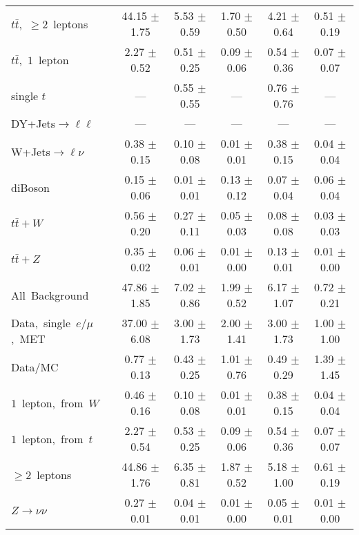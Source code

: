 \documentclass{article}
\begin{document}
\begin{longtable}{|l|c|c|c|c|c|}
$t\bar{t}$,~$\ge2$~leptons & 44.15 $\pm$ 1.75  & 5.53 $\pm$ 0.59  & 1.70 $\pm$ 0.50  & 4.21 $\pm$ 0.64  & 0.51 $\pm$ 0.19 \\* 
$t\bar{t}$,~$1$~lepton & 2.27 $\pm$ 0.52  & 0.51 $\pm$ 0.25  & 0.09 $\pm$ 0.06  & 0.54 $\pm$ 0.36  & 0.07 $\pm$ 0.07 \\* 
single $t$  & ---  & 0.55 $\pm$ 0.55  & ---  & 0.76 $\pm$ 0.76  & --- \\* 
DY+Jets$\rightarrow\ell\ell$  & ---  & ---  & ---  & ---  & --- \\* 
W+Jets$\rightarrow\ell\nu$  & 0.38 $\pm$ 0.15  & 0.10 $\pm$ 0.08  & 0.01 $\pm$ 0.01  & 0.38 $\pm$ 0.15  & 0.04 $\pm$ 0.04 \\* 
diBoson  & 0.15 $\pm$ 0.06  & 0.01 $\pm$ 0.01  & 0.13 $\pm$ 0.12  & 0.07 $\pm$ 0.04  & 0.06 $\pm$ 0.04 \\* 
$t\bar{t}+W$  & 0.56 $\pm$ 0.20  & 0.27 $\pm$ 0.11  & 0.05 $\pm$ 0.03  & 0.08 $\pm$ 0.08  & 0.03 $\pm$ 0.03 \\* 
$t\bar{t}+Z$  & 0.35 $\pm$ 0.02  & 0.06 $\pm$ 0.01  & 0.01 $\pm$ 0.00  & 0.13 $\pm$ 0.01  & 0.01 $\pm$ 0.00 \\* 
\hline \hline 
All~Background  & 47.86 $\pm$ 1.85  & 7.02 $\pm$ 0.86  & 1.99 $\pm$ 0.52  & 6.17 $\pm$ 1.07  & 0.72 $\pm$ 0.21 \\* 
Data,~single~$e/\mu$,~MET  & 37.00 $\pm$ 6.08  & 3.00 $\pm$ 1.73  & 2.00 $\pm$ 1.41  & 3.00 $\pm$ 1.73  & 1.00 $\pm$ 1.00 \\* 
Data/MC  & 0.77 $\pm$ 0.13  & 0.43 $\pm$ 0.25  & 1.01 $\pm$ 0.76  & 0.49 $\pm$ 0.29  & 1.39 $\pm$ 1.45 \\* 
\hline \hline 
$1$~lepton,~from~$W$  & 0.46 $\pm$ 0.16  & 0.10 $\pm$ 0.08  & 0.01 $\pm$ 0.01  & 0.38 $\pm$ 0.15  & 0.04 $\pm$ 0.04 \\* 
$1$~lepton,~from~$t$  & 2.27 $\pm$ 0.54  & 0.53 $\pm$ 0.25  & 0.09 $\pm$ 0.06  & 0.54 $\pm$ 0.36  & 0.07 $\pm$ 0.07 \\* 
$\ge2$~leptons  & 44.86 $\pm$ 1.76  & 6.35 $\pm$ 0.81  & 1.87 $\pm$ 0.52  & 5.18 $\pm$ 1.00  & 0.61 $\pm$ 0.19 \\* 
$Z\rightarrow\nu\nu$  & 0.27 $\pm$ 0.01  & 0.04 $\pm$ 0.01  & 0.01 $\pm$ 0.00  & 0.05 $\pm$ 0.01  & 0.01 $\pm$ 0.00 \\* 
\hline 
\end{longtable} 

 
 
 
 
\pagebreak 

 
 
\end{document}
